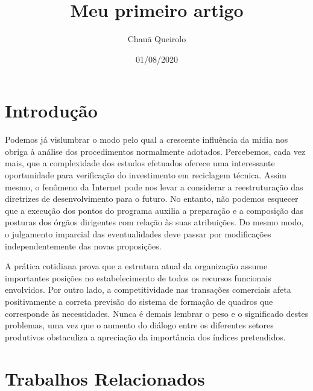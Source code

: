 \documentclass{article}
\title{Meu primeiro artigo}
\date{01/08/2020}
\author{Chauã Queirolo}
\begin{document}
\maketitle

 
\section{Introdução}

 Podemos já vislumbrar o modo pelo qual a crescente influência da mídia nos obriga à análise dos procedimentos normalmente adotados. Percebemos, cada vez mais, que a complexidade dos estudos efetuados oferece uma interessante oportunidade para verificação do investimento em reciclagem técnica. Assim mesmo, o fenômeno da Internet pode nos levar a considerar a reestruturação das diretrizes de desenvolvimento para o futuro. No entanto, não podemos esquecer que a execução dos pontos do programa auxilia a preparação e a composição das posturas dos órgãos dirigentes com relação às suas atribuições. Do mesmo modo, o julgamento imparcial das eventualidades deve passar por modificações independentemente das novas proposições.

          A prática cotidiana prova que a estrutura atual da organização assume importantes posições no estabelecimento de todos os recursos funcionais envolvidos. Por outro lado, a competitividade nas transações comerciais afeta positivamente a correta previsão do sistema de formação de quadros que corresponde às necessidades. Nunca é demais lembrar o peso e o significado destes problemas, uma vez que o aumento do diálogo entre os diferentes setores produtivos obstaculiza a apreciação da importância dos índices pretendidos.

\section{Trabalhos Relacionados}
\end{document}
